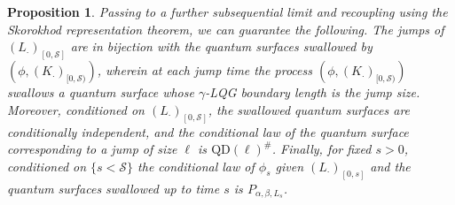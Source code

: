 \documentclass[a4paper]{article}
\numberwithin{equation}{section}
\newcommand{\qduration}{\mathcal{S}}
\newcommand{\QD}{\mathrm{QD}}
\newtheorem{proposition}[theorem]{Proposition}
\theoremstyle{remark}
\numberwithin{equation}{section}
\begin{document}
\begin{proposition}\label{prop-swallowed}
Passing to a further subsequential limit and recoupling using the Skorokhod representation theorem, we can guarantee the following. The jumps of $(L_\cdot)_{[0,\qduration]}$ are in bijection with the quantum surfaces swallowed by $(\phi, (K_\cdot)_{[0,\qduration)})$, wherein at each jump time the process $(\phi, (K_\cdot)_{[0,\qduration)})$ swallows a quantum surface whose $\gamma$-LQG boundary length is the jump size. Moreover, conditioned on $(L_{\cdot})_{[0,\qduration]}$, the swallowed quantum surfaces are conditionally independent, and the conditional law of the quantum surface corresponding to a jump of size $\ell$ is $\QD(\ell)^\#$. Finally, for fixed $s>0$, conditioned on $\{s < \qduration\}$ the conditional law of $\phi_s$ given $(L_\cdot)_{[0,s]}$ and the quantum surfaces swallowed up to time $s$ is $P_{\alpha, \beta, L_s}$.
\end{proposition}
\end{document}

